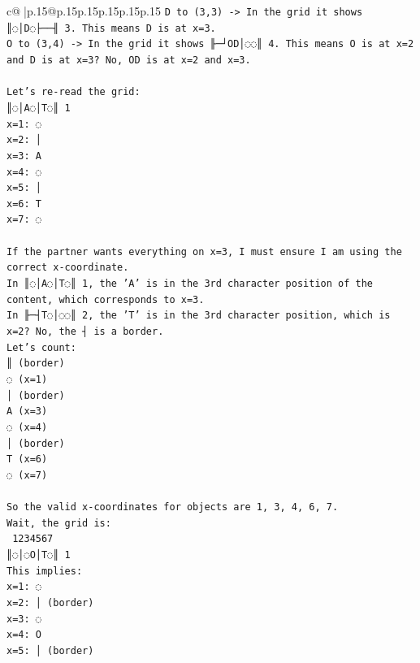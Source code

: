 \documentclass{article}
\begin{document}
{\begin{supertabular}{c@{$\;$}|p{.15\linewidth}@{}p{.15\linewidth}p{.15\linewidth}p{.15\linewidth}p{.15\linewidth}p{.15\linewidth}}
{{{\texttt{D to (3,3) {-}> In the grid it shows ║◌│D◌├──╢ 3. This means D is at x=3.} \\
\texttt{O to (3,4) {-}> In the grid it shows ╟─┘OD│◌◌║ 4. This means O is at x=2 and D is at x=3? No, OD is at x=2 and x=3.} \\
\\ 
\texttt{Let's re{-}read the grid:} \\
\texttt{║◌│A◌│T◌║ 1} \\
\texttt{x=1: ◌} \\
\texttt{x=2: │} \\
\texttt{x=3: A} \\
\texttt{x=4: ◌} \\
\texttt{x=5: │} \\
\texttt{x=6: T} \\
\texttt{x=7: ◌} \\
\\ 
\texttt{If the partner wants everything on x=3, I must ensure I am using the correct x{-}coordinate.} \\
\texttt{In ║◌│A◌│T◌║ 1, the 'A' is in the 3rd character position of the content, which corresponds to x=3.} \\
\texttt{In ╟─┤T◌│◌◌║ 2, the 'T' is in the 3rd character position, which is x=2? No, the ┤ is a border.} \\
\texttt{Let's count:} \\
\texttt{║ (border)} \\
\texttt{◌ (x=1)} \\
\texttt{│ (border)} \\
\texttt{A (x=3)} \\
\texttt{◌ (x=4)} \\
\texttt{│ (border)} \\
\texttt{T (x=6)} \\
\texttt{◌ (x=7)} \\
\\ 
\texttt{So the valid x{-}coordinates for objects are 1, 3, 4, 6, 7.} \\
\texttt{Wait, the grid is:} \\
\texttt{ 1234567} \\
\texttt{║◌│◌O│T◌║ 1} \\
\texttt{This implies:} \\
\texttt{x=1: ◌} \\
\texttt{x=2: │ (border)} \\
\texttt{x=3: ◌} \\
\texttt{x=4: O} \\
\texttt{x=5: │ (border)} \\
}}}
\end{supertabular}}
\end{document}
